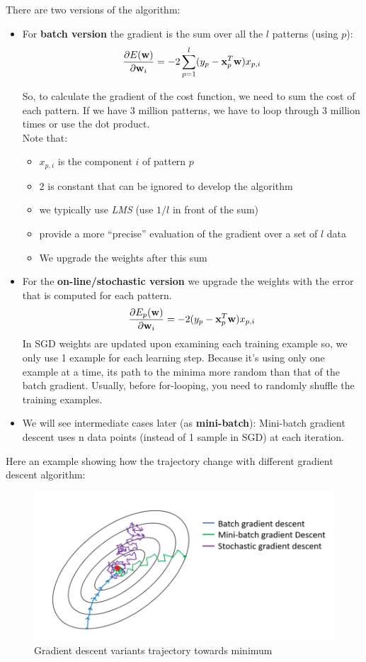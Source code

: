 \documentclass[../main.tex]{subfiles}
\begin{document}
There are two versions of the algorithm:
\begin{itemize}
    \item For \textbf{batch version} the gradient is the sum over all the $l$ patterns (using $p$):
$$\frac{\partial E(\mathbf{w})}{\partial\mathbf{w}_i} = -2\sum_{p = 1}^{l} (y_p - \bold{x}_p^T\bold{w})x_{p,i}$$

So, to calculate the gradient of the cost function, we need to sum the cost of each pattern. If we have 3 million patterns, we have to loop through 3 million times or use the dot product.\\
\noindent Note that:
\begin{itemize}
    \item $x_{p,i}$ is the component $i$ of pattern $p$
    \item $2$ is constant that can be ignored to develop the algorithm
    \item we typically use \emph{LMS} (use $1/l$ in front of the sum)
    \item provide a more “precise” evaluation of the gradient over a set of $l$ data
    \item We upgrade the weights after this sum
\end{itemize}

\item For the \textbf{on-line/stochastic version} we upgrade the weights with the error that is computed for each pattern.
$$\frac{\partial E_p(\mathbf{w})}{\partial\mathbf{w}_i} = -2(y_p - \bold{x}_p^T\bold{w})x_{p,i}$$
In SGD weights are updated upon examining each training example so, we only use 1 example for each learning step. Because it’s using only one example at a time, its path to the minima more random than that of the batch gradient. Usually, before for-looping, you need to randomly shuffle the training examples.
\item We will see intermediate cases later (as \textbf{mini-batch}): Mini-batch gradient descent uses n data points (instead of 1 sample in SGD) at each iteration.
\end{itemize}
Here an example showing how the trajectory change with different gradient descent algorithm:
\begin{figure}[H]
    \centering
    \includegraphics[scale = 0.3]{lectures/2_linear_model/gradient_versions.png}
    \caption{Gradient descent variants trajectory towards minimum}
    \label{fig:2_gradient_trajectory}
\end{figure}
\end{document}
